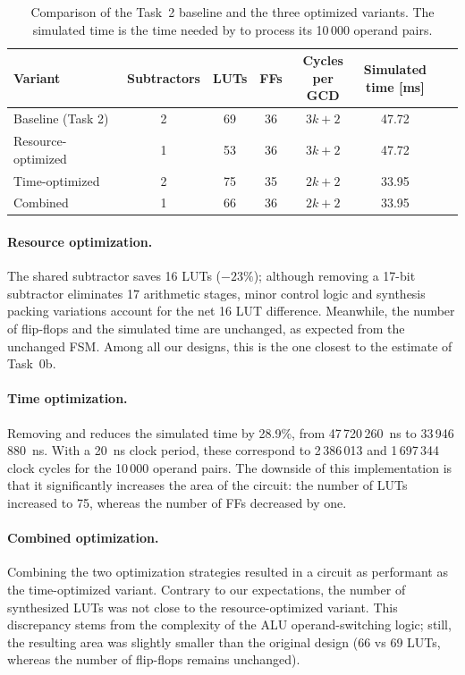 \begin{table}[H]
    \centering
    \small
    \begin{tabular}{lccccccc}
        \toprule
        Variant & Subtractors & LUTs & FFs & \makecell{Cycles\\per GCD} & \makecell{Simulated\\time [ms]} \\
        \midrule
        Baseline (Task 2)  & 2 & 69 & 36 & $3k+2$ & 47.72 \\
        Resource-optimized & 1 & 53 & 36 & $3k+2$ & 47.72 \\
        Time-optimized     & 2 & 75 & 35 & $2k+2$ & 33.95 \\
        Combined           & 1 & 66 & 36 & $2k+2$ & 33.95 \\
        \bottomrule
    \end{tabular}
    \caption{Comparison of the Task~2 baseline and the three optimized variants. The simulated time is the time needed by  to process its 10\,000 operand pairs.}
    \label{tab:t3_results}
\end{table}

\paragraph{Resource optimization.}
The shared subtractor saves 16 LUTs ($-23\%$); although removing a 17-bit subtractor eliminates 17 arithmetic stages, minor control logic and synthesis packing variations account for the net 16 LUT difference. Meanwhile, the number of flip-flops and the simulated time are unchanged, as expected from the unchanged FSM. Among all our designs, this is the one closest to the estimate of Task~0b.

\paragraph{Time optimization.}
Removing  and  reduces the simulated time by 28.9\%, from 47\,720\,260~ns to 33\,946\,880~ns. With a 20~ns clock period, these correspond to 2\,386\,013 and 1\,697\,344 clock cycles for the 10\,000 operand pairs. The downside of this implementation is that it significantly increases the area of the circuit: the number of LUTs increased to 75, whereas the number of FFs decreased by one. 

\paragraph{Combined optimization.}
Combining the two optimization strategies resulted in a circuit as performant as the time-optimized variant. Contrary to our expectations, the number of synthesized LUTs was not close to the resource-optimized variant. This discrepancy stems from the complexity of the ALU operand-switching logic; still, the resulting area was slightly smaller than the original design (66 vs 69 LUTs, whereas the number of flip-flops remains unchanged).


